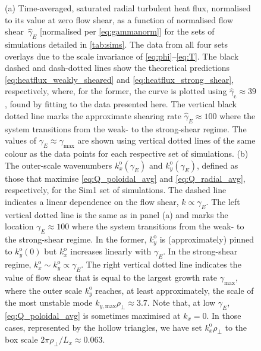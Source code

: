 \documentclass{jpp}
\newcommand{\kxo}{k_x^\text{o}}
\newcommand{\kyo}{k_y^\text{o}}
\newcommand{\kyoO}{k_{y}^\text{o}(0)}
\newcommand{\gammaaninorm}{\hat{\gamma}_{\text{c}}}
\newcommand{\gammaE}{\gamma_{E}}
\newcommand{\gammaEhat}{\hat{\gamma}_{E}}
\begin{document}
\begin{figure}
	\caption{(a) Time-averaged, saturated radial turbulent heat flux, normalised to its value at zero flow shear, as a function of normalised flow shear~\(\gammaEhat\) [normalised per \cref{eq:gammanorm}] for the sets of simulations detailed in \cref{tab:sims}. The data from all four sets overlays due to the scale invariance of \mbox{\cref{eq:phi}--\cref{eq:T}}. The black dashed and dash-dotted lines show the theoretical predictions \cref{eq:heatflux_weakly_sheared} and \cref{eq:heatflux_strong_shear}, respectively, where, for the former, the curve is plotted using \(\gammaaninorm \approx 39\), found by fitting to the data presented here. The vertical black dotted line marks the approximate shearing rate \(\gammaEhat\approx 100\) where the system transitions from the weak- to the strong-shear regime. The values of \(\gammaE \approx \gamma_\text{max}\) are shown using vertical dotted lines of the same colour as the data points for each respective set of simulations. (b) The outer-scale wavenumbers \(\kxo(\gammaE)\) and \(\kyo(\gammaE)\), defined as those that maximise \cref{eq:Q_poloidal_avg} and \cref{eq:Q_radial_avg}, respectively, for the Sim1 set of simulations. The dashed line indicates a linear dependence on the flow shear, \(k \propto \gammaE\). The left vertical dotted line is the same as in panel (a) and marks the location \(\gammaE \approx 100\) where the system transitions from the weak- to the strong-shear regime. In the former, \(\kyo\) is (approximately) pinned to \(\kyoO\) but \(\kxo\) increases linearly with \(\gammaE\). In the strong-shear regime, \(\kxo \sim \kyo \propto \gammaE\). The right vertical dotted line indicates the value of flow shear that is equal to the largest growth rate \(\gamma_\text{max}\), where the outer scale \(\kyo\) reaches, at least approximately, the scale of the most unstable mode \(k_{y, \text{max}}\rho_\perp \approx 3.7\). Note that, at low \(\gammaE\), \cref{eq:Q_poloidal_avg} is sometimes maximised at \(k_x = 0\). In those cases, represented by the hollow triangles, we have set \(\kxo\rho_\perp\) to the box scale \(2\pi \rho_\perp/L_x \approx 0.063\). }
	\label{fig:Q_vs_gammaE}
	\label{fig:outerscale_vs_gammaE}
\end{figure}
\end{document}
